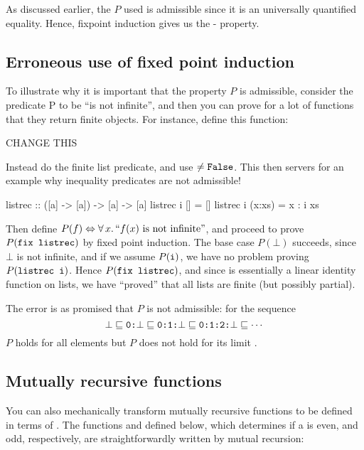 As discussed earlier, the $P$ used is admissible since it is an
universally quantified equality. Hence, fixpoint induction gives us the
- property.

\subsection{Erroneous use of fixed point induction}

To illustrate why it is important that the property $P$ is admissible,
consider the predicate P to be “is not infinite”, and then you can
prove for a lot of functions that they return finite objects. For
instance, define this function:

CHANGE THIS

  Instead do the finite list predicate, and use $\neq
  \hs{False}$. This then servers for an example why inequality
  predicates are not admissible!

\begin{code}
listrec :: ([a] -> [a]) -> [a] -> [a]
listrec i [] = []
listrec i (x:xs) = x : i xs
\end{code}

Then define
$P(f) \Leftrightarrow \forall \, x . \, ``f(x) \,\, \mathrm{is \,\, not \,\, infinite}"$,
and proceed to prove $P(\hs{fix listrec})$ by fixed point induction. The
base case $P(\bot)$ succeeds, since $\bot$ is not infinite, and if we
assume $P(\hs{i})$, we have no problem proving $P(\hs{listrec i})$.
Hence $P(\hs{fix listrec})$, and since  is essentially
a linear identity function on lists, we have ``proved'' that all lists
are finite (but possibly partial).

The error is as promised that $P$ is not admissible: for the sequence
\begin{equation*}
\bot \sqsubseteq
\hs{0:}\bot \sqsubseteq
\hs{0:1:}\bot \sqsubseteq
\hs{0:1:2:}\bot \sqsubseteq
\cdots
\end{equation*}
$P$ holds for all elements but $P$ does not hold for its limit \hs{[0..]}.

\subsection{Mutually recursive functions}

You can also mechanically transform mutually recursive functions to be
defined in terms of . The functions  and 
defined below, which determines if a  is even, and odd,
respectively, are straightforwardly written by mutual recursion:

